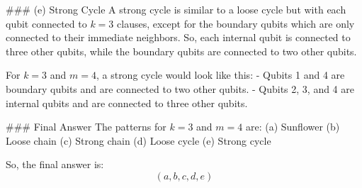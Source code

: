 ### (e) Strong Cycle
A strong cycle is similar to a loose cycle but with each qubit connected to \( k = 3 \) clauses, except for the boundary qubits which are only connected to their immediate neighbors. So, each internal qubit is connected to three other qubits, while the boundary qubits are connected to two other qubits.

For \( k = 3 \) and \( m = 4 \), a strong cycle would look like this:
- Qubits 1 and 4 are boundary qubits and are connected to two other qubits.
- Qubits 2, 3, and 4 are internal qubits and are connected to three other qubits.

### Final Answer
The patterns for \( k = 3 \) and \( m = 4 \) are:
(a) Sunflower
(b) Loose chain
(c) Strong chain
(d) Loose cycle
(e) Strong cycle

So, the final answer is:
\[
\boxed{(a, b, c, d, e)}
\]